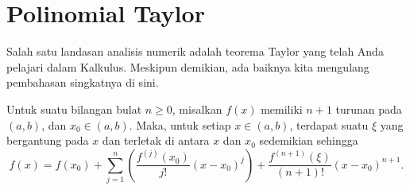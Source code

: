 
\section{\label{sec:Taylor}Polinomial Taylor}

Salah satu landasan analisis numerik adalah teorema Taylor yang telah
Anda pelajari dalam Kalkulus. Meskipun demikian, ada baiknya kita
mengulang pembahasan singkatnya di sini.
\begin{thm}
\label{thm:Taylors}Untuk suatu bilangan bulat
$n\geq0$, misalkan $f(x)$ memiliki $n+1$ turunan pada $(a,b)$,
dan $x_{0}\in(a,b)$. Maka, untuk setiap $x\in(a,b)$, terdapat suatu
$\xi$ yang bergantung pada $x$ dan terletak di antara $x$ dan $x_{0}$
sedemikian sehingga
\[
f(x)=f(x_{0})+\sum_{j=1}^{n}\left(\frac{f^{(j)}(x_{0})}{j!}(x-x_{0})^{j}\right)+\frac{f^{(n+1)}(\xi)}{(n+1)!}(x-x_{0})^{n+1}.
\]
\end{thm}

